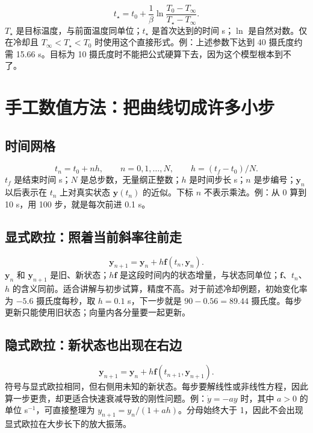 \documentclass[UTF8,zihao=-4,openany,oneside,fontset=windows]{ctexbook}
\begin{document}
\begin{equation}
t_\star=t_0+\frac{1}{\beta}\ln\frac{T_0-T_\infty}{T_\star-T_\infty}.
\end{equation}
$T_\star$ 是目标温度，与前面温度同单位；$t_\star$ 是首次达到的时间 s；$\ln$ 是自然对数。仅在冷却且 $T_\infty<T_\star<T_0$ 时使用这个直接形式。例：上述参数下达到 40 摄氏度约需 15.66 s。目标为 10 摄氏度时不能把公式硬算下去，因为这个模型根本到不了。

\section{手工数值方法：把曲线切成许多小步}
\subsection{时间网格}
\begin{equation}
t_n=t_0+nh,\qquad n=0,1,\ldots,N,\qquad h=(t_f-t_0)/N.
\end{equation}
$t_f$ 是结束时间 s；$N$ 是总步数，无量纲正整数；$h$ 是时间步长 s；$n$ 是步编号；$\boldsymbol y_n$ 以后表示在 $t_n$ 上对真实状态 $\boldsymbol y(t_n)$ 的近似。下标 $n$ 不表示乘法。例：从 0 算到 10 s，用 100 步，就是每次前进 0.1 s。

\subsection{显式欧拉：照着当前斜率往前走}
\begin{equation}
\boldsymbol y_{n+1}=\boldsymbol y_n+h\boldsymbol f(t_n,\boldsymbol y_n).
\end{equation}
$\boldsymbol y_n$ 和 $\boldsymbol y_{n+1}$ 是旧、新状态；$h\boldsymbol f$ 是这段时间内的状态增量，与状态同单位；$\boldsymbol f$、$t_n$、$h$ 的含义同前。适合讲解与初步试算，精度不高。对于前述冷却例题，初始变化率为 $-5.6$ 摄氏度每秒，取 $h=0.1$ s，下一步就是 $90-0.56=89.44$ 摄氏度。每步更新只能使用旧状态；向量内各分量要一起更新。

\subsection{隐式欧拉：新状态也出现在右边}
\begin{equation}
\boldsymbol y_{n+1}=\boldsymbol y_n+h\boldsymbol f(t_{n+1},\boldsymbol y_{n+1}).
\end{equation}
符号与显式欧拉相同，但右侧用未知的新状态。每步要解线性或非线性方程，因此算一步更贵，却更适合快速衰减导致的刚性问题。例：$\dot y=-a y$ 时，其中 $a>0$ 的单位 s$^{-1}$，可直接整理为 $y_{n+1}=y_n/(1+ah)$。分母始终大于 1，因此不会出现显式欧拉在大步长下的放大振荡。
\end{document}
